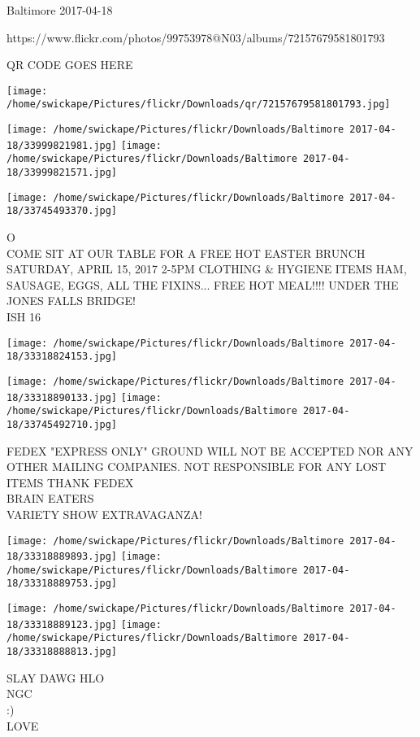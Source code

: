\documentclass[10pt,letterpaper]{article}
\begin{document}
Baltimore 2017-04-18

https://www.flickr.com/photos/99753978@N03/albums/72157679581801793

QR CODE GOES HERE

\texttt{[image: /home/swickape/Pictures/flickr/Downloads/qr/72157679581801793.jpg]}
\pagebreak

\texttt{[image: /home/swickape/Pictures/flickr/Downloads/Baltimore 2017-04-18/33999821981.jpg]}
\texttt{[image: /home/swickape/Pictures/flickr/Downloads/Baltimore 2017-04-18/33999821571.jpg]}

\texttt{[image: /home/swickape/Pictures/flickr/Downloads/Baltimore 2017-04-18/33745493370.jpg]}

O\\
COME SIT AT OUR TABLE FOR A FREE HOT EASTER BRUNCH SATURDAY, APRIL 15, 2017 2{-}5PM CLOTHING \& HYGIENE ITEMS HAM, SAUSAGE, EGGS, ALL THE FIXINS... FREE HOT MEAL!!!! UNDER THE JONES FALLS BRIDGE!\\
ISH 16\\
\pagebreak

\texttt{[image: /home/swickape/Pictures/flickr/Downloads/Baltimore 2017-04-18/33318824153.jpg]}

\vspace{0.25in}
\texttt{[image: /home/swickape/Pictures/flickr/Downloads/Baltimore 2017-04-18/33318890133.jpg]}
\texttt{[image: /home/swickape/Pictures/flickr/Downloads/Baltimore 2017-04-18/33745492710.jpg]}

FEDEX "EXPRESS ONLY" GROUND WILL NOT BE ACCEPTED NOR ANY OTHER MAILING COMPANIES.  NOT RESPONSIBLE FOR ANY LOST ITEMS THANK FEDEX\\
BRAIN EATERS\\
VARIETY SHOW EXTRAVAGANZA!\\
\pagebreak

\texttt{[image: /home/swickape/Pictures/flickr/Downloads/Baltimore 2017-04-18/33318889893.jpg]}
\texttt{[image: /home/swickape/Pictures/flickr/Downloads/Baltimore 2017-04-18/33318889753.jpg]}

\texttt{[image: /home/swickape/Pictures/flickr/Downloads/Baltimore 2017-04-18/33318889123.jpg]}
\texttt{[image: /home/swickape/Pictures/flickr/Downloads/Baltimore 2017-04-18/33318888813.jpg]}

SLAY DAWG HLO\\
NGC\\
:)\\
LOVE\\
\pagebreak
\end{document}
